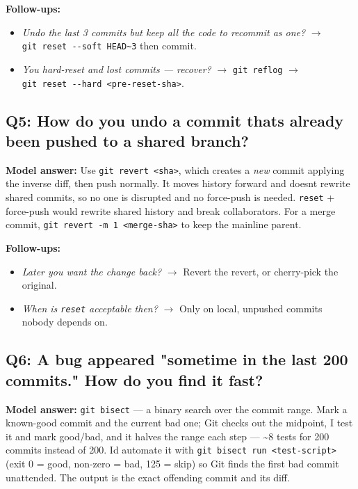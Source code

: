 \documentclass[11pt]{article}
\providecommand{\tightlist}{\setlength{\itemsep}{1pt}\setlength{\parskip}{0pt}}
\begin{document}
\textbf{Follow-ups:}

\begin{itemize}
\tightlist
\item
  \emph{Undo the last 3 commits but keep all the code to recommit as one?} \(\rightarrow\) \texttt{git\ reset\ -\/-soft\ HEAD\textasciitilde{}3} then commit.
\item
  \emph{You hard-reset and lost commits --- recover?} \(\rightarrow\) \texttt{git\ reflog} \(\rightarrow\) \texttt{git\ reset\ -\/-hard\ \textless{}pre-reset-sha\textgreater{}}.
\end{itemize}

\subsection{Q5: How do you undo a commit that\textquotesingle s already been pushed to a shared branch?}\label{q5-how-do-you-undo-a-commit-thats-already-been-pushed-to-a-shared-branch}

\textbf{Model answer:} Use \texttt{git\ revert\ \textless{}sha\textgreater{}}, which creates a \emph{new} commit applying the inverse diff, then push normally. It moves history forward and doesn\textquotesingle t rewrite shared commits, so no one is disrupted and no force-push is needed. \texttt{reset} + force-push would rewrite shared history and break collaborators. For a merge commit, \texttt{git\ revert\ -m\ 1\ \textless{}merge-sha\textgreater{}} to keep the mainline parent.

\textbf{Follow-ups:}

\begin{itemize}
\tightlist
\item
  \emph{Later you want the change back?} \(\rightarrow\) Revert the revert, or cherry-pick the original.
\item
  \emph{When is \texttt{reset} acceptable then?} \(\rightarrow\) Only on local, unpushed commits nobody depends on.
\end{itemize}

\subsection{Q6: A bug appeared "sometime in the last 200 commits." How do you find it fast?}\label{q6-a-bug-appeared-sometime-in-the-last-200-commits-how-do-you-find-it-fast}

\textbf{Model answer:} \texttt{git\ bisect} --- a binary search over the commit range. Mark a known-good commit and the current bad one; Git checks out the midpoint, I test it and mark good/bad, and it halves the range each step --- \textasciitilde8 tests for 200 commits instead of 200. I\textquotesingle d automate it with \texttt{git\ bisect\ run\ \textless{}test-script\textgreater{}} (exit 0 = good, non-zero = bad, 125 = skip) so Git finds the first bad commit unattended. The output is the exact offending commit and its diff.
\end{document}
